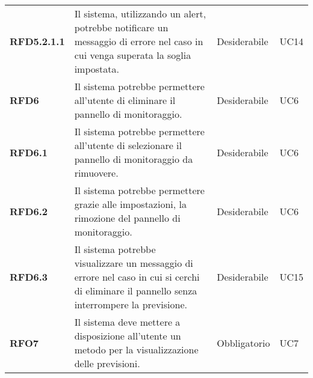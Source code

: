 \begin{longtable}[H]{>{\centering\bfseries}m{2cm} >{\centering}m{9cm} >{\centering}m{2.5cm} >{\centering\arraybackslash}m{2.5cm}}
  \textbf{RFD5.2.1.1} & Il sistema, utilizzando un alert, potrebbe notificare un messaggio di errore nel caso in cui venga superata la soglia impostata. & Desiderabile & UC14 \\
  \textbf{RFD6} & Il sistema potrebbe permettere all'utente di eliminare il pannello di monitoraggio. & Desiderabile & UC6 \\
  \textbf{RFD6.1} & Il sistema potrebbe permettere all'utente di selezionare il pannello di monitoraggio da rimuovere. & Desiderabile & UC6 \\
  \textbf{RFD6.2} & Il sistema potrebbe permettere grazie alle impostazioni, la rimozione del pannello di monitoraggio. & Desiderabile & UC6 \\
  \textbf{RFD6.3} & Il sistema potrebbe visualizzare un messaggio di errore nel caso in cui si cerchi di eliminare il pannello senza interrompere la previsione. & Desiderabile & UC15 \\
  \textbf{RFO7} & Il sistema deve mettere a disposizione all'utente un metodo per la visualizzazione delle previsioni. & Obbligatorio & UC7 \\


\end{longtable}
